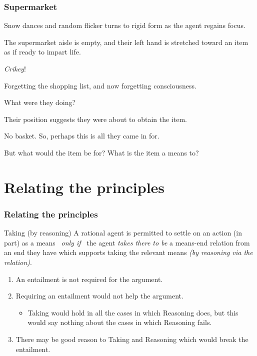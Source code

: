 \documentclass[noamssymb,
graphics,
]{beamer} %
\newcommand{\schemaName}[1]{\textsf{#1}}
\begin{document}
\begin{frame}
  \frametitle{Supermarket}

  {\rmfamily

    Snow dances and random flicker turns to rigid form as the agent regains focus.

    The supermarket aisle is empty, and their left hand is stretched toward an item as if ready to impart life.

    \emph{Crikey}!

    Forgetting the shopping list, and now forgetting consciousness.

    What were they doing?

    Their position suggests they were about to obtain the item.

    No basket. So, perhaps this is all they came in for.

    But what would the item be for?  What is the item a means to?

  }
\end{frame}

\section{Relating the principles}

\begin{frame}
  \frametitle{Relating the principles}

  \begin{block}{Taking (by reasoning)}
    A rational agent is permitted to settle on an action (in part) as a means
    \newline
    \mbox{ }\hfill\emph{only if}\hfill\mbox{ }
    \newline
    the agent \emph{takes there to be}  a means-end relation from an end they have which supports taking the relevant means \emph{(by reasoning via the relation)}.
  \end{block}

  \begin{enumerate}
  \item An entailment is not required for the argument.
  \item Requiring an entailment would not help the argument.
    \begin{itemize}
    \item \schemaName{Taking} would hold in all the cases in which \schemaName{Reasoning} does, but this would say nothing about the cases in which \schemaName{Reasoning} fails.
    \end{itemize}
  \item There may be good reason to \schemaName{Taking} and \schemaName{Reasoning} which would break the entailment.
  \end{enumerate}
\end{frame}
\end{document}
